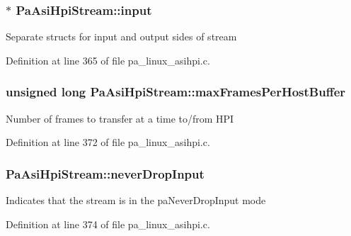 \subsubsection[{\texorpdfstring{input}{input}}]{$\ast$ Pa\+Asi\+Hpi\+Stream\+::input}\hypertarget{struct_pa_asi_hpi_stream_a5c0b414b7ab1b1f2fef8fa5512a1e944}{}\label{struct_pa_asi_hpi_stream_a5c0b414b7ab1b1f2fef8fa5512a1e944}
Separate structs for input and output sides of stream 

Definition at line 365 of file pa\+\_\+linux\+\_\+asihpi.\+c.

\subsubsection[{\texorpdfstring{max\+Frames\+Per\+Host\+Buffer}{maxFramesPerHostBuffer}}]{\setlength{\rightskip}{0pt plus 5cm}unsigned long Pa\+Asi\+Hpi\+Stream\+::max\+Frames\+Per\+Host\+Buffer}\hypertarget{struct_pa_asi_hpi_stream_abcaf386b2ddf78d402841682d6b9ff2c}{}\label{struct_pa_asi_hpi_stream_abcaf386b2ddf78d402841682d6b9ff2c}
Number of frames to transfer at a time to/from H\+PI 

Definition at line 372 of file pa\+\_\+linux\+\_\+asihpi.\+c.

\subsubsection[{\texorpdfstring{never\+Drop\+Input}{neverDropInput}}]{ Pa\+Asi\+Hpi\+Stream\+::never\+Drop\+Input}\hypertarget{struct_pa_asi_hpi_stream_a4310add2bc6454a4a9a2aeede23a4fea}{}\label{struct_pa_asi_hpi_stream_a4310add2bc6454a4a9a2aeede23a4fea}
Indicates that the stream is in the pa\+Never\+Drop\+Input mode 

Definition at line 374 of file pa\+\_\+linux\+\_\+asihpi.\+c.

